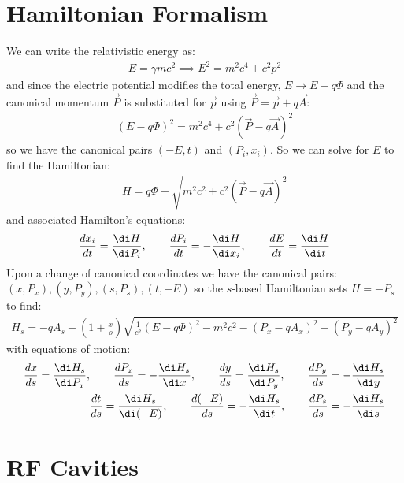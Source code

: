 \documentclass{article}
\numberwithin{equation}{section}
\begin{document}
\section{ Hamiltonian Formalism }
We can write the relativistic energy as:
\begin{align}
E = \gamma m c^2 \implies E^2 = m^2 c^4 + c^2 p^2
\end{align}
and since the electric potential modifies the total energy, $E \rightarrow E-q\Phi$ and the canonical momentum $\vec{P}$ is substituted for $\vec{p}$ using $\vec{P} = \vec{p} + q \vec{A}$:
\begin{align}
(E-q\Phi)^2 = m^2 c^4 + c^2 (\vec{P} - q \vec{A})^2
\end{align}
so we have the canonical pairs $(-E,t)$ and $(P_i, x_i)$. So we can solve for $E$ to find the Hamiltonian:
\begin{align}
H = q\Phi + \sqrt{ m^2 c^2 + c^2 (\vec{P}-q \vec{A})^2}
\end{align}
and associated Hamilton's equations:
\begin{align}
\frac{dx_i}{dt} = \frac{\di H}{\di P_i} ,\qquad 
\frac{d P_i}{dt} = -\frac{\di H}{\di x_i} , \qquad
\frac{d E}{dt} = \frac{\di H}{\di t}
\end{align}
Upon a change of canonical coordinates we have the canonical pairs: $(x,P_x), (y,P_y), (s,P_s), (t,-E)$ so the $s$-based Hamiltonian sets $H = -P_s$ to find:
\begin{align}
H_s = -q A_s - \left( 1 + \frac{x}{\rho}\right)\sqrt{ \frac{1}{c^2}(E-q\Phi)^2-m^2 c^2 - (P_x - qA_x)^2- (P_y - qA_y)^2}
\end{align}
with equations of motion:
\begin{align}
\frac{dx}{ds} = \frac{\di H_s}{\di P_x} ,\qquad 
\frac{d P_x}{ds} = - \frac{\di H_s}{\di x} , \qquad
\frac{dy}{ds} = \frac{\di H_s}{\di P_y} ,\qquad 
\frac{d P_y}{ds} = - \frac{\di H_s}{\di y} \\
\frac{dt}{ds} = \frac{\di H_s}{\di(-E)} , \qquad 
\frac{d(-E)}{ds} = - \frac{\di H_s}{\di t}, \qquad
\frac{d P_s}{ds} = - \frac{\di H_s}{\di s}
\end{align}


\section{RF Cavities}
\end{document}
